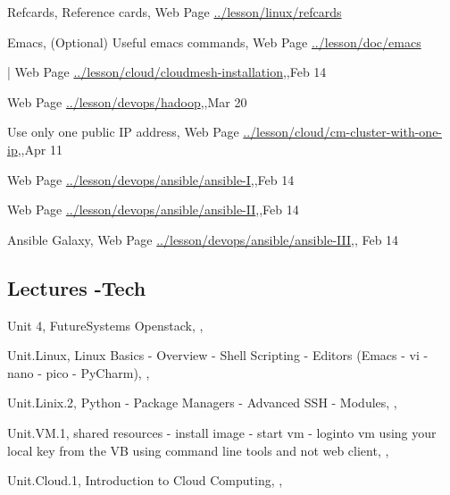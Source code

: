 
Refcards, Reference cards, Web Page \url{../lesson/linux/refcards}

Emacs, (Optional) Useful emacs commands, Web Page \url{../lesson/doc/emacs}


| Web Page \url{../lesson/cloud/cloudmesh-installation},,Feb 14


Web Page \url{../lesson/devops/hadoop},,Mar 20

Use only one public IP address, Web Page \url{../lesson/cloud/cm-cluster-with-one-ip},,Apr 11


Web Page \url{../lesson/devops/ansible/ansible-I},,Feb 14


Web Page \url{../lesson/devops/ansible/ansible-II},,Feb 14

Ansible Galaxy, Web Page \url{../lesson/devops/ansible/ansible-III},, Feb 14


\subsection{Lectures -Tech}

Unit 4, FutureSystems Openstack, , 


Unit.Linux, Linux Basics - Overview - Shell Scripting -  Editors (Emacs - vi - nano - pico - PyCharm), ,

Unit.Linix.2, Python - Package Managers - Advanced SSH - Modules, ,

Unit.VM.1, shared resources - install image -  start vm -  loginto vm using your local key from the VB using command line tools and not web client, ,

Unit.Cloud.1, Introduction to Cloud Computing, , 

